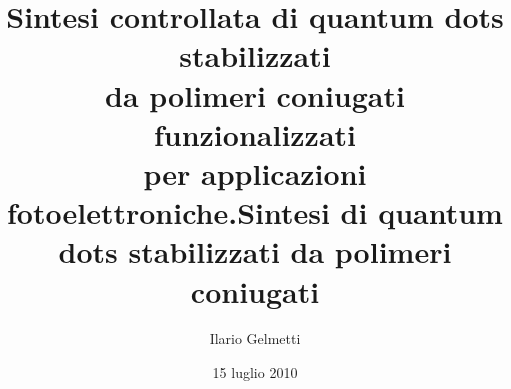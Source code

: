 \documentclass[hyperref={pdfpagelabels=false}]{beamer} %
\title{Sintesi controllata di quantum dots stabilizzati \\da polimeri coniugati funzionalizzati \\per applicazioni fotoelettroniche.}
\author{Ilario Gelmetti}
\institute{Università di Pisa}
\date{15 luglio 2010}
\begin{document}
\begin{frame}
  \titlepage
\end{frame}
\title{Sintesi di quantum dots stabilizzati da polimeri coniugati}


\begin{frame}
\setcounter{tocdepth}{1}
\tableofcontents
\end{frame}
\setcounter{tocdepth}{2}







\end{document}

